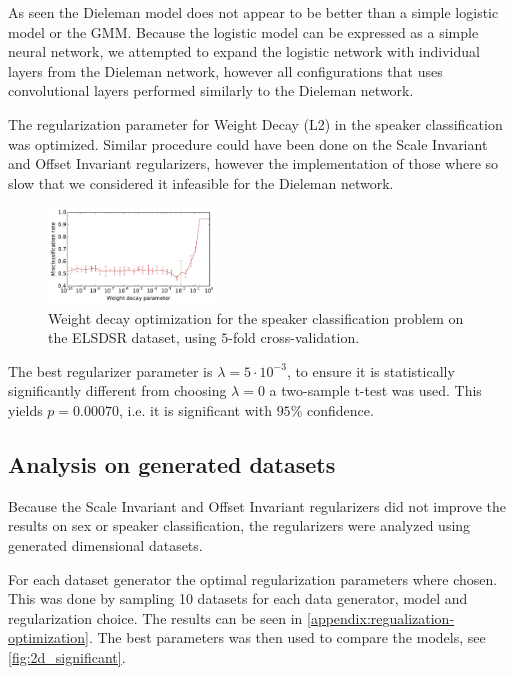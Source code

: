 As seen the Dieleman model does not appear to be better than a simple logistic model or the GMM. Because the logistic model can be expressed as a simple neural network, we attempted to expand the logistic network with individual layers from the Dieleman network, however all configurations that uses convolutional layers performed similarly to the Dieleman network.

The regularization parameter for Weight Decay (L2) in the speaker classification was optimized. Similar procedure could have been done on the Scale Invariant and Offset Invariant regularizers, however the implementation of those where so slow that we considered it infeasible for the Dieleman network.

\begin{figure}[H]
  \centering
  \includegraphics[width=0.4\textwidth]{plots/reg_opt_dieleman_speaker_elsdsr}
  \caption{Weight decay optimization for the speaker classification problem on the ELSDSR dataset, using $5$-fold cross-validation.}
  \label{fig:reg_opt}
\end{figure}

The best regularizer parameter is $\lambda = 5 \cdot 10^{-3}$, to ensure it is statistically significantly different from choosing $\lambda = 0$ a two-sample t-test was used. This yields $p = 0.00070$, i.e. it is significant with $95\%$ confidence.

\subsection{Analysis on generated datasets}

Because the Scale Invariant and Offset Invariant regularizers did not improve the results on sex or speaker classification, the regularizers were analyzed using generated dimensional datasets.

For each dataset generator the optimal regularization parameters where chosen. This was done by sampling 10 datasets for each data generator, model and regularization choice. The results can be seen in \cref{appendix:regualization-optimization}. The best parameters was then used to compare the models, see \cref{fig:2d_significant}.

